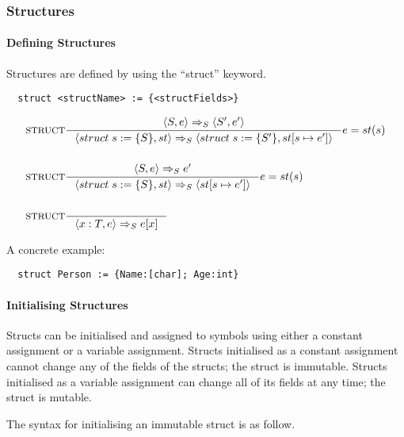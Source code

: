 \subsubsection{Structures}
\label{subsec:structs}

\paragraph{Defining Structures}
\label{sec:defStructures}

Structures are defined by using the \enquote{struct} keyword. 

\begin{verbatim}
  struct <structName> := {<structFields>}
\end{verbatim}

\begin{align*}
&\inference[$\text{STRUCT}$]{\Braket{S, e} \Rightarrow_S \Braket{S', e'}}
                            {\Braket{struct\;s := \{S\}, st} \Rightarrow_S \Braket{struct\;s := \{S'\}, st[s \mapsto e']}}
                            {e=st(s)}
\\\\
&\inference[$\text{STRUCT}$]{\Braket{S, e} \Rightarrow_S e'}
                            {\Braket{struct\;s := \{S\}, st} \Rightarrow_S \Braket{st[s \mapsto e']}}
                            {e=st(s)}
\\\\
&\inference[$\text{STRUCT}$]{}
                            {\Braket{x:T, e} \Rightarrow_S e[x]}
\end{align*}

A concrete example:

\begin{verbatim}
  struct Person := {Name:[char]; Age:int}
\end{verbatim}

\paragraph{Initialising Structures}
\label{sec:initStructures}

Structs can be initialised and assigned to symbols using either a constant assignment or a variable assignment. Structs initialised as a constant assignment cannot change any of the fields of the structs; the struct is immutable. Structs initialised as a variable assignment can change all of its fields at any time; the struct is mutable.

The syntax for initialising an immutable struct is as follow.

